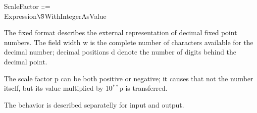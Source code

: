 \begin{removed}
ScaleFactor ::=\\
\x Expression$\S $WithIntegerAsValue
\end{removed}
The fixed format describes the external representation of decimal fixed
point numbers. The field width w is the complete number of characters
available for the decimal number; decimal positions d denote the number
of digits behind the decimal point. 
\begin{removed}
The scale factor p can be both
positive or negative; 
it causes that not the number itself, but its
value multiplied by 10$^{**}$p is transferred.
\end{removed}
\begin{added}
The behavior is described separatelly for input and output.
\end{added}

